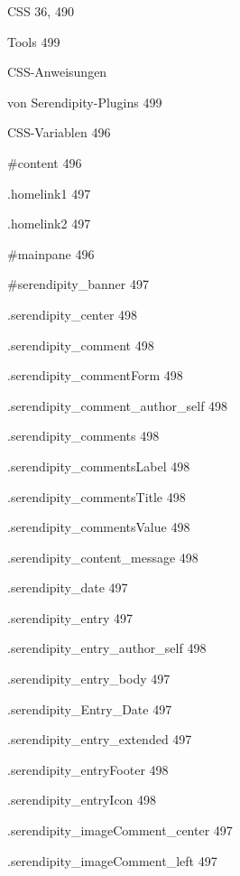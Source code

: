 \documentclass{book}
\renewcommand\subitem{\par}
\begin{document}
\begin{multicols}{2}
\begin{osp-index}
  \item CSS\hspace{1mm} 36, 490
    \subitem Tools\hspace{1mm} 499
  \item CSS-Anweisungen
    \subitem von Serendipity-Plugins\hspace{1mm} 499
  \item CSS-Variablen\hspace{1mm} 496
    \subitem \#content\hspace{1mm} 496
    \subitem .homelink1\hspace{1mm} 497
    \subitem .homelink2\hspace{1mm} 497
    \subitem \#mainpane\hspace{1mm} 496
    \subitem \#serendipity\_banner\hspace{1mm} 497
    \subitem .serendipity\_center\hspace{1mm} 498
    \subitem .serendipity\_comment\hspace{1mm} 498
    \subitem .serendipity\_commentForm\hspace{1mm} 498
    \subitem .serendipity\_comment\_author\_self\hspace{1mm} 498
    \subitem .serendipity\_comments\hspace{1mm} 498
    \subitem .serendipity\_commentsLabel\hspace{1mm} 498
    \subitem .serendipity\_commentsTitle\hspace{1mm} 498
    \subitem .serendipity\_commentsValue\hspace{1mm} 498
    \subitem .serendipity\_content\_message\hspace{1mm} 498
    \subitem .serendipity\_date\hspace{1mm} 497
    \subitem .serendipity\_entry\hspace{1mm} 497
    \subitem .serendipity\_entry\_author\_self\hspace{1mm} 498
    \subitem .serendipity\_entry\_body\hspace{1mm} 497
    \subitem .serendipity\_Entry\_Date\hspace{1mm} 497
    \subitem .serendipity\_entry\_extended\hspace{1mm} 497
    \subitem .serendipity\_entryFooter\hspace{1mm} 498
    \subitem .serendipity\_entryIcon\hspace{1mm} 498
    \subitem .serendipity\_imageComment\_center\hspace{1mm} 497
    \subitem .serendipity\_imageComment\_left\hspace{1mm} 497

\end{osp-index}
\end{multicols}
\end{document}
